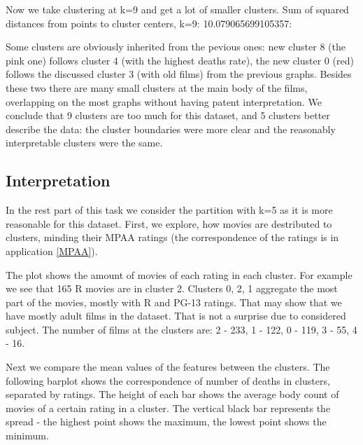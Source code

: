 \documentclass[a4paper,14pt]{article}
\begin{document}
Now we take clustering at  k=9 and get a lot of smaller clusters. Sum of squared distances from points to cluster centers, k=9: 10.079065699105357: 
 
    \begin{center}
\end{center}


Some clusters are obviously inherited from the pevious ones: new cluster 8 (the pink one) follows cluster 4 (with the highest deaths rate), the new cluster 0 (red) follows the discussed cluster 3 (with old films) from the previous graphs. Besides these two there are many small clusters at the main body of the films, overlapping on the most graphs without having patent interpretation. We conclude that 9 clusters are too much for this dataset, and 5 clusters better describe the data: the cluster boundaries were more clear and the reasonably interpretable clusters were the same.

\subsection{Interpretation}

In the rest part of this task we consider the partition with k=5 as it is more reasonable for this dataset. First, we explore, how movies are destributed to clusters, minding their MPAA ratings (the correspondence of the ratings is in application \ref{MPAA}). 

           
\begin{center}
\end{center}

The plot shows the amount of movies of each rating in each cluster. For example we see that 165 R movies are in cluster 2. Clusters 0, 2, 1 aggregate the most part of the movies, mostly with R and PG-13 ratings. That may show that we have mostly adult films in the dataset. That is not a surprise due to considered subject. The number of films at the clusters are: 
2  -  233,
1  -  122,
0  -  119,
3  -   55,
4  -   16.

Next we compare the mean values of the features between the clusters. The following barplot shows the correspondence of number of deaths in clusters, separated by ratings. The height of each bar shows the average body count of movies of a certain rating in a cluster. The vertical black bar represents the spread - the highest point shows the maximum, the lowest point shows the minimum.
\end{document}
